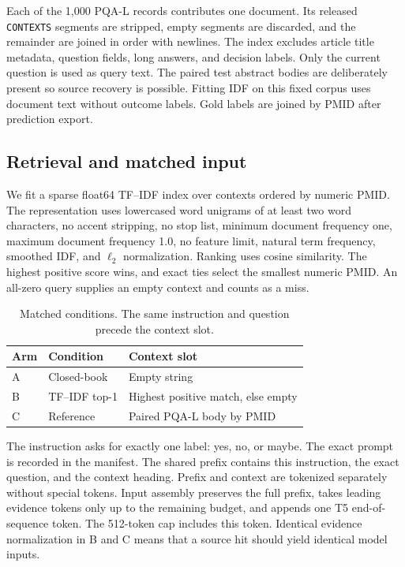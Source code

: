 \documentclass[manuscript,nonacm]{acmart}
\begin{document}
Each of the 1,000 PQA-L records contributes one document. Its released \texttt{CONTEXTS} segments are stripped, empty segments are discarded, and the remainder are joined in order with newlines. The index excludes article title metadata, question fields, long answers, and decision labels. Only the current question is used as query text. The paired test abstract bodies are deliberately present so source recovery is possible. Fitting IDF on this fixed corpus uses document text without outcome labels. Gold labels are joined by PMID after prediction export.

\subsection{Retrieval and matched input}
We fit a sparse float64 TF--IDF index over contexts ordered by numeric PMID. The representation uses lowercased word unigrams of at least two word characters, no accent stripping, no stop list, minimum document frequency one, maximum document frequency 1.0, no feature limit, natural term frequency, smoothed IDF, and $\ell_2$ normalization. Ranking uses cosine similarity. The highest positive score wins, and exact ties select the smallest numeric PMID. An all-zero query supplies an empty context and counts as a miss.

\begin{table}[htbp]
\caption{Matched conditions. The same instruction and question precede the context slot.}
\label{tab:arms}
\centering
\begin{tabular}{@{}lll@{}}
\toprule Arm & Condition & Context slot\\\midrule
A & Closed-book & Empty string\\
B & TF--IDF top-1 & Highest positive match, else empty\\
C & Reference & Paired PQA-L body by PMID\\\bottomrule
\end{tabular}
\end{table}

The instruction asks for exactly one label: yes, no, or maybe. The exact prompt is recorded in the manifest. The shared prefix contains this instruction, the exact question, and the context heading. Prefix and context are tokenized separately without special tokens. Input assembly preserves the full prefix, takes leading evidence tokens only up to the remaining budget, and appends one T5 end-of-sequence token. The 512-token cap includes this token. Identical evidence normalization in B and C means that a source hit should yield identical model inputs.
\end{document}
